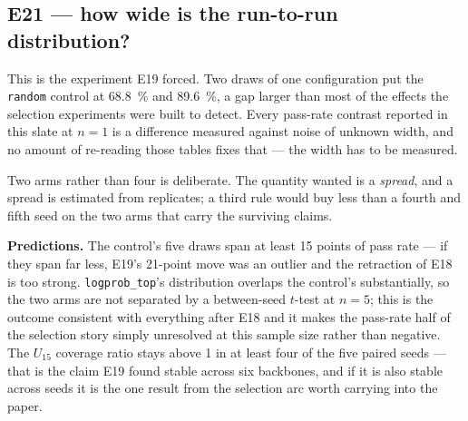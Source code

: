 \subsection*{E21 --- how wide is the run-to-run distribution?}


This is the experiment E19 forced. Two draws of one configuration put the
\texttt{random} control at \SI{68.8}{\percent} and \SI{89.6}{\percent}, a gap
larger than most of the effects the selection experiments were built to detect.
Every pass-rate contrast reported in this slate at $n = 1$ is a difference
measured against noise of unknown width, and no amount of re-reading those
tables fixes that --- the width has to be measured.

Two arms rather than four is deliberate. The quantity wanted is a
\emph{spread}, and a spread is estimated from replicates; a third rule would buy
less than a fourth and fifth seed on the two arms that carry the surviving
claims.

\textbf{Predictions.} The control's five draws span at least 15 points of pass
rate --- if they span far less, E19's 21-point move was an outlier and the
retraction of E18 is too strong. \texttt{logprob\_top}'s distribution overlaps
the control's substantially, so the two arms are not separated by a
between-seed $t$-test at $n = 5$; this is the outcome consistent with everything
after E18 and it makes the pass-rate half of the selection story simply
unresolved at this sample size rather than negative. The $U_{15}$ coverage ratio
stays above 1 in at least four of the five paired seeds --- that is the claim
E19 found stable across six backbones, and if it is also stable across seeds it
is the one result from the selection arc worth carrying into the paper.


